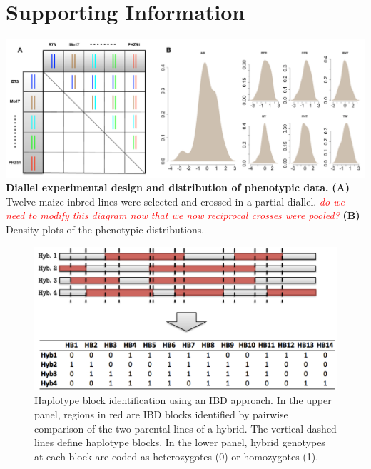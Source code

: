 \documentclass[9pt,twocolumn,twoside]{gsajnl}
\newcommand{\beginsupplement}{%
        \setcounter{table}{0}
        \renewcommand{\thetable}{S\arabic{table}}%
        \setcounter{figure}{0}
        \renewcommand{\thefigure}{S\arabic{figure}}%
     }
\newcommand{\jri}[1]{\textcolor{red}{ \emph{ #1}} }
\begin{document}

\clearpage




\onecolumn
\pagebreak
\beginsupplement

\section*{Supporting Information}

\begin{center}\vspace{1cm}

\includegraphics[width=0.8\linewidth]{SFig_pvp.pdf}
{\color{black} \textbf{Diallel experimental design and distribution of phenotypic data.}
\textbf{(A)} Twelve maize inbred lines were selected and crossed in a partial diallel. \jri{do we need to modify this diagram now that we now reciprocal crosses were pooled?} \textbf{(B)} Density plots of the phenotypic distributions.
}
\label{fig:pvp-pheno}
\end{center}\vspace{1cm}

\begin{figure}[htbp]
\centering
\includegraphics[width=\linewidth]{SFig_define_IBD.pdf}
\caption{Haplotype block identification using an IBD approach. In the upper panel, regions in red are IBD blocks identified by pairwise comparison of the two parental lines of a hybrid. The vertical dashed lines define haplotype blocks. In the lower panel, hybrid genotypes at each block are coded as heterozygotes (0) or homozygotes (1).}
\label{fig:defineibd}
\end{figure}
\end{document}

